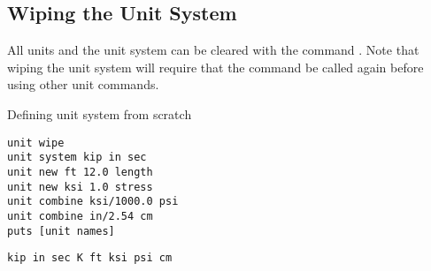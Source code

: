 \documentclass{article}
\begin{document}
\subsection{Wiping the Unit System}
All units and the unit system can be cleared with the command . 
Note that wiping the unit system will require that the command  be called again before using other unit commands. 
\begin{syntax}
\end{syntax}

\begin{example}{Defining unit system from scratch}
\begin{lstlisting}
unit wipe
unit system kip in sec
unit new ft 12.0 length
unit new ksi 1.0 stress
unit combine ksi/1000.0 psi
unit combine in/2.54 cm 
puts [unit names]
\end{lstlisting}
\tcblower
\begin{lstlisting}
kip in sec K ft ksi psi cm
\end{lstlisting}
\end{example}
\end{document}
